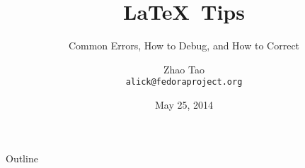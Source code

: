 \documentclass[CJKchecksingle]{beamer}
\title[\LaTeX\ Tips]%
{\LaTeX\ Tips}
\subtitle{Common Errors, How to Debug, and How to Correct}
\author[alick] %
{Zhao Tao\\ \texttt{alick@fedoraproject.org}}
\institute[Fedora] %
{
\texttt{[image: wu.jpg]}\\
\inst{1}Fedora Project
\and
\inst{2}Tsinghua University TUNA Asscociation (TUNA)
\and
\inst{3}Tsinghua University
}
\date[FUDCon APAC 2014] %
{May 25, 2014}
\begin{document}
\begin{frame}
\titlepage
\end{frame}

\begin{frame}{Outline}
\tableofcontents
\end{frame}




%
%
\end{document}

